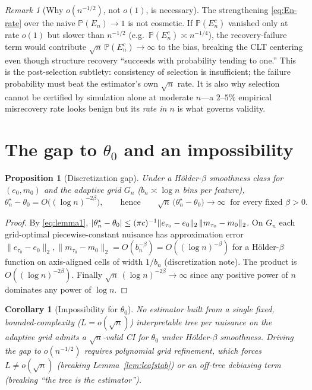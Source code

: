 \documentclass[11pt]{article}
\theoremstyle{plain}
\newtheorem{proposition}{Proposition}
\newtheorem{corollary}{Corollary}
\theoremstyle{definition}
\theoremstyle{remark}
\newtheorem*{remark}{Remark}
\newcommand{\PP}{\mathbb{P}}
\newcommand{\ez}{e_0}
\newcommand{\mz}{m_0}
\newcommand{\Ltwo}[1]{\lVert #1 \rVert_{2}}
\DeclarePairedDelimiter{\abs}{\lvert}{\rvert}
\newcommand{\etau}{e_{\tau_0}}
\newcommand{\mtau}{m_{\tau_0}}
\newcommand{\thstar}{\theta^{\star}_n}
\newcommand{\odiff}{o}
\begin{document}
\begin{remark}[Why $\odiff(n^{-1/2})$, not $\odiff(1)$, is necessary]\label{rem:rate-necessity}
The strengthening \eqref{eq:En-rate} over the naive $\PP(E_n)\to1$ is not
cosmetic. If $\PP(E_n^c)$ vanished only at rate $\odiff(1)$ but slower than
$n^{-1/2}$ (e.g.\ $\PP(E_n^c)\asymp n^{-1/4}$), the recovery-failure term would
contribute $\sqrt n\,\PP(E_n^c)\to\infty$ to the bias, breaking the CLT centering
even though structure recovery ``succeeds with probability tending to one.''
This is the post-selection subtlety: consistency of selection is insufficient;
the failure probability must beat the estimator's own $\sqrt n$ rate. It is also
why selection cannot be certified by simulation alone at moderate $n$---a $2$--$5\%$
empirical misrecovery rate looks benign but its \emph{rate in $n$} is what governs
validity.
\end{remark}

\section{The gap to \texorpdfstring{$\theta_0$}{theta0} and an impossibility}\label{sec:gap}

\begin{proposition}[Discretization gap]\label{prop:gap}
Under a H\"older-$\beta$ smoothness class for $(\ez,\mz)$ and the adaptive grid
$G_n$ ($b_n\asymp\log n$ bins per feature),
\[
  \thstar-\theta_0 = O\!\bigl((\log n)^{-2\beta}\bigr),
  \qquad\text{hence}\qquad
  \sqrt n\,\bigl(\thstar-\theta_0\bigr)\longrightarrow\infty
  \ \text{ for every fixed }\beta>0.
\]
\end{proposition}

\begin{proof}
By \eqref{eq:lemma1}, $\abs{\thstar-\theta_0}\le(\pi c)^{-1}
\Ltwo{\etau-\ez}\,\Ltwo{\mtau-\mz}$. On $G_n$ each grid-optimal
piecewise-constant nuisance has approximation error
$\Ltwo{\etau-\ez},\Ltwo{\mtau-\mz}=O(b_n^{-\beta})=O((\log n)^{-\beta})$ for a
H\"older-$\beta$ function on axis-aligned cells of width $1/b_n$ (discretization
note). The product is $O((\log n)^{-2\beta})$. Finally
$\sqrt n\,(\log n)^{-2\beta}\to\infty$ since any positive power of $n$ dominates
any power of $\log n$.
\end{proof}

\begin{corollary}[Impossibility for $\theta_0$]\label{cor:impossible}
No estimator built from a single \emph{fixed}, \emph{bounded-complexity}
($L=\odiff(\sqrt n)$) interpretable tree per nuisance on the adaptive grid admits
a $\sqrt n$-valid CI for $\theta_0$ under H\"older-$\beta$ smoothness. Driving the
gap to $\odiff(n^{-1/2})$ requires polynomial grid refinement, which forces
$L\not=\odiff(\sqrt n)$ (breaking Lemma~\ref{lem:leafstab}) or an off-tree
debiasing term (breaking ``the tree is the estimator'').
\end{corollary}
\end{document}
